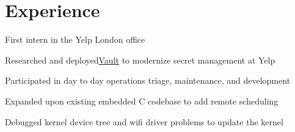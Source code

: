 \documentclass[letterpaper]{deedy-resume} %
\begin{document}
\begin{minipage}[t]{0.66\textwidth} %


\section{Experience}


\vspace{\topsep} %

\begin{tightitemize}
\item First intern in the Yelp London office
\end{tightitemize}

\sectionspace %



\vspace{\topsep} %

\begin{tightitemize}
\item Researched and deployed\href{https://vaultproject.io}{Vault} to modernize secret management at Yelp
\item Participated in day to day operations triage, maintenance, and development
\end{tightitemize}

\sectionspace %




\begin{tightitemize}
\item Expanded upon existing embedded C codebase to add remote scheduling
\item Debugged kernel device tree and wifi driver problems to update the kernel
\end{tightitemize}


\end{minipage}
\end{document}

